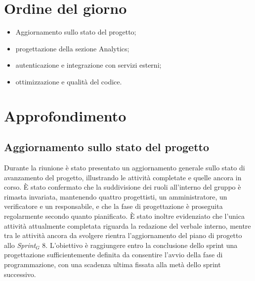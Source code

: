 \documentclass[10pt, letterpaper]{article}
\begin{document}
\makeTitlePage


\newpage

\tableofcontents

\newpage


\makeMeetingParticipantsTable

\section{Ordine del giorno}
\begin{itemize}
  \item Aggiornamento sullo stato del progetto;
  \item progettazione della sezione Analytics;
  \item autenticazione e integrazione con servizi esterni;
  \item ottimizzazione e qualità del codice.
\end{itemize}

\section{Approfondimento}

\subsection{Aggiornamento sullo stato del progetto}
Durante la riunione è stato presentato un aggiornamento generale sullo stato di avanzamento del progetto, illustrando le attività completate e quelle ancora in corso. È stato confermato che la suddivisione dei ruoli all’interno del gruppo è rimasta invariata, mantenendo quattro progettisti, un amministratore, un verificatore e un responsabile, e che la fase di progettazione è proseguita regolarmente secondo quanto pianificato.
\noindent
È stato inoltre evidenziato che l’unica attività attualmente completata riguarda la redazione del verbale interno, mentre tra le attività ancora da svolgere rientra l’aggiornamento del piano di progetto allo \textit{Sprint$_G$} 8. L’obiettivo è raggiungere entro la conclusione dello sprint una progettazione sufficientemente definita da consentire l’avvio della fase di programmazione, con una scadenza ultima fissata alla metà dello sprint successivo.
\end{document}
